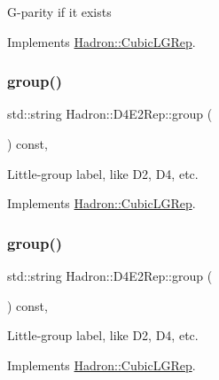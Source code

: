 G-\/parity if it exists 

Implements \mbox{\hyperlink{structHadron_1_1CubicLGRep_ace26f7b2d55e3a668a14cb9026da5231}{Hadron\+::\+Cubic\+L\+G\+Rep}}.

\mbox{\label{structHadron_1_1D4E2Rep_a7e858bda6dc247afd5e372ddbc3fcfe5}} 
\subsubsection{\texorpdfstring{group()}{group()}\hspace{0.1cm}{\footnotesize\ttfamily [1/5]}}
{\footnotesize\ttfamily std\+::string Hadron\+::\+D4\+E2\+Rep\+::group (\begin{DoxyParamCaption}{ }\end{DoxyParamCaption}) const\hspace{0.3cm}{\ttfamily [inline]}, {\ttfamily [virtual]}}

Little-\/group label, like D2, D4, etc. 

Implements \mbox{\hyperlink{structHadron_1_1CubicLGRep_a9bdb14b519a611d21379ed96a3a9eb41}{Hadron\+::\+Cubic\+L\+G\+Rep}}.

\mbox{\label{structHadron_1_1D4E2Rep_a7e858bda6dc247afd5e372ddbc3fcfe5}} 
\subsubsection{\texorpdfstring{group()}{group()}\hspace{0.1cm}{\footnotesize\ttfamily [2/5]}}
{\footnotesize\ttfamily std\+::string Hadron\+::\+D4\+E2\+Rep\+::group (\begin{DoxyParamCaption}{ }\end{DoxyParamCaption}) const\hspace{0.3cm}{\ttfamily [inline]}, {\ttfamily [virtual]}}

Little-\/group label, like D2, D4, etc. 

Implements \mbox{\hyperlink{structHadron_1_1CubicLGRep_a9bdb14b519a611d21379ed96a3a9eb41}{Hadron\+::\+Cubic\+L\+G\+Rep}}.

\mbox{\label{structHadron_1_1D4E2Rep_a7e858bda6dc247afd5e372ddbc3fcfe5}} 
